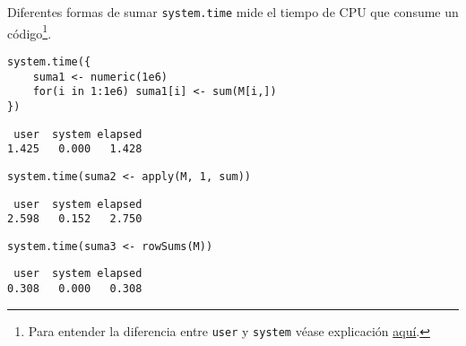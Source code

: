 \documentclass[xcolor={usenames,svgnames,dvipsnames}]{beamer}
\begin{document}
\begin{frame}[label={sec:orgd268ca5},fragile]{Diferentes formas de sumar}
 \texttt{system.time} mide el tiempo de CPU que consume un código\footnote{Para entender la diferencia entre \texttt{user} y \texttt{system} véase explicación \href{http://r.789695.n4.nabble.com/Meaning-of-proc-time-tp2303263p2306691.html}{aquí}.}.

\lstset{language=r,label= ,caption= ,captionpos=b,numbers=none}
\begin{lstlisting}
system.time({
    suma1 <- numeric(1e6)
    for(i in 1:1e6) suma1[i] <- sum(M[i,])
})
\end{lstlisting}

\begin{verbatim}
 user  system elapsed 
1.425   0.000   1.428
\end{verbatim}


\lstset{language=r,label= ,caption= ,captionpos=b,numbers=none}
\begin{lstlisting}
system.time(suma2 <- apply(M, 1, sum))
\end{lstlisting}

\begin{verbatim}
 user  system elapsed 
2.598   0.152   2.750
\end{verbatim}


\lstset{language=r,label= ,caption= ,captionpos=b,numbers=none}
\begin{lstlisting}
system.time(suma3 <- rowSums(M))
\end{lstlisting}

\begin{verbatim}
 user  system elapsed 
0.308   0.000   0.308
\end{verbatim}
\end{frame}
\end{document}
